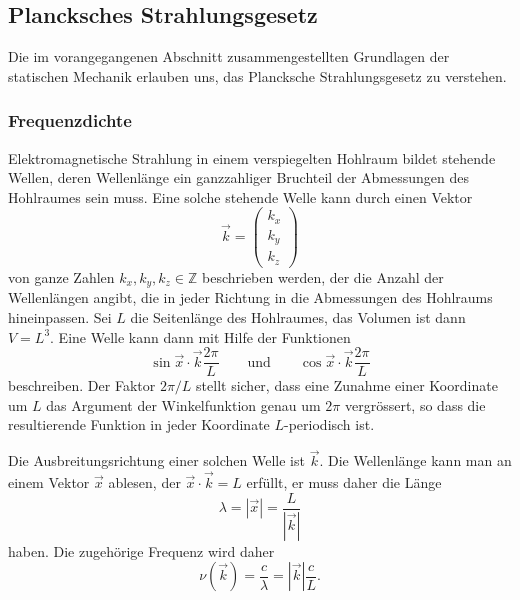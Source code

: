 \subsection{Plancksches Strahlungsgesetz%
\label{skript:cmb:section:planck}}
Die im vorangegangenen Abschnitt zusammengestellten Grundlagen der
statischen Mechanik erlauben uns, das Plancksche Strahlungsgesetz
zu verstehen.

\subsubsection{Frequenzdichte}
Elektromagnetische Strahlung in einem verspiegelten Hohlraum bildet
stehende Wellen,
deren Wellenlänge ein ganzzahliger Bruchteil der Abmessungen des
Hohlraumes sein muss.
Eine solche stehende Welle kann durch einen Vektor
\[
\vec{k} = \begin{pmatrix}k_x\\k_y\\k_z\end{pmatrix}
\]
von ganze Zahlen $k_x,k_y,k_z\in\mathbb Z$ beschrieben werden, der
die Anzahl der Wellenlängen angibt, die in jeder Richtung in die
Abmessungen des Hohlraums hineinpassen.
Sei $L$ die Seitenlänge des Hohlraumes, das Volumen ist dann $V=L^3$.
Eine Welle kann dann mit Hilfe der Funktionen
\[
\sin \vec{x}\cdot\vec{k}\frac{2\pi}{L}
\qquad\text{und}\qquad
\cos \vec{x}\cdot\vec{k}\frac{2\pi}{L}
\]
beschreiben.
Der Faktor $2\pi/L$ stellt sicher, dass eine Zunahme einer Koordinate
um $L$ das Argument der Winkelfunktion genau um $2\pi$ vergrössert,
so dass die resultierende Funktion in jeder Koordinate $L$-periodisch ist.

Die Ausbreitungsrichtung einer solchen Welle ist $\vec{k}$.
Die Wellenlänge kann man an einem Vektor $\vec{x}$ ablesen, der
$\vec{x}\cdot\vec{k}=L$ erfüllt, er muss daher die Länge
\[
\lambda
=
|\vec{x}|
=
\frac{L}{|\vec{k}|}
\]
haben.
Die zugehörige Frequenz wird daher
\[
\nu(\vec{k})
=
\frac{c}{\lambda}=|\vec{k}|\frac{c}{L}.
\]

